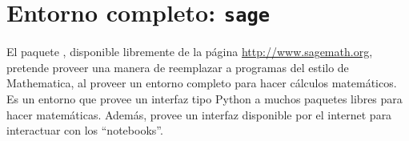 \section{Entorno completo: \texttt{sage}}
El paquete , disponible libremente de la página \url{http://www.sagemath.org}, pretende proveer una manera de reemplazar a programas del estilo de Mathematica, al proveer un entorno completo para hacer cálculos matemáticos. Es un entorno que provee un interfaz tipo Python a muchos paquetes libres para hacer matemáticas.  Además, provee un interfaz disponible por el internet para interactuar con los ``notebooks''.






